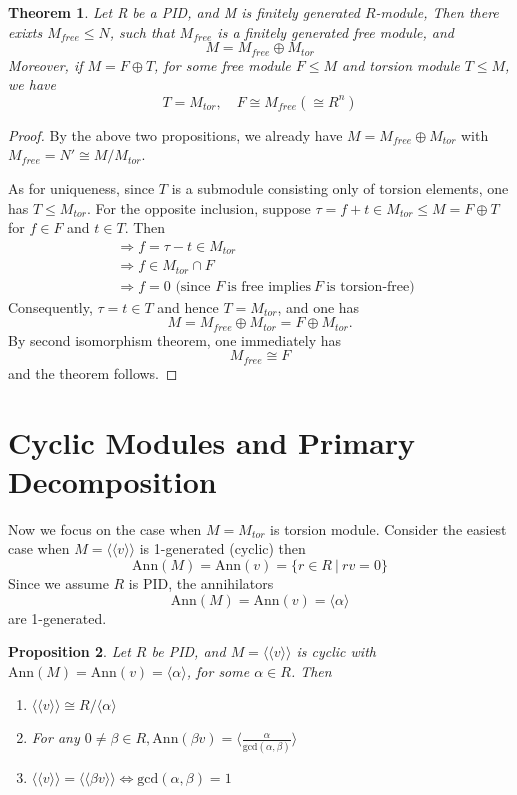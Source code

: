 \documentclass[12pt]{amsbook}
\newtheorem{theorem}{Theorem}[section]
\newtheorem{proposition}[theorem]{Proposition}
\begin{document}
\begin{theorem}
    Let R be a PID, and M is finitely generated $R$-module, Then there exixts $M_{free}\leq N$, such that $M_{free}$ is a finitely generated free module, and 
    $$M=M_{free}\oplus M_{tor}$$
    Moreover, if $M=F\oplus T$, for some free module $F\leq M$ and torsion module $T\leq M$, we have 
    $$T=M_{tor},\quad F\cong M_{free}(\cong R^n)$$
\end{theorem}

\begin{proof}
    By the above two propositions, we already have 
    $M= M_{free} \oplus M_{tor}$ with $M_{free} = N'\cong M/M_{tor}$.

    As for uniqueness, since $T$ is a submodule consisting only of torsion elements, one has $T\leq M_{tor}$. For the opposite inclusion, suppose $\tau = f+t\in M_{tor}\leq M=F\oplus T$
    for $f \in F$ and $t \in T$. Then
    \begin{align*}
        &\Rightarrow f=\tau-t \in M_{tor} \\
        &\Rightarrow f\in M_{tor} \cap F \\
        &\Rightarrow f=0 \text{ (since } F\ \text{is free implies}\ F\ \text{is torsion-free)}
    \end{align*}
    Consequently, $\tau=t\in T$ and hence $T = M_{tor}$, and one has
    $$M=M_{free}\oplus M_{tor}=F\oplus M_{tor}.$$
    By second isomorphism theorem, one immediately has $$M_{free}\cong F$$
    and the theorem follows.
\end{proof}

\section{Cyclic Modules and Primary Decomposition}
Now we focus on the case when $M=M_{tor}$ is torsion module. Consider the easiest case when
$M=\langle\langle v \rangle\rangle$ is 1-generated (cyclic) then
$$\mathrm{Ann}(M)=\mathrm{Ann}(v)=\{r\in R\ |\ rv=0\}$$
Since we assume $R$ is PID, the annihilators
$$\mathrm{Ann}(M)=\mathrm{Ann}(v)=\langle \alpha \rangle $$ 
are 1-generated.

\begin{proposition} \label{prop-cyclic}
    Let $R$ be PID, and $M=\langle\langle v \rangle\rangle$ is cyclic with $\mathrm{Ann}(M)=\mathrm{Ann}(v)=\langle \alpha \rangle$, for some $\alpha\in R$. Then
    \begin{enumerate}
        \item $\langle\langle v \rangle\rangle \cong R/\langle \alpha \rangle$
        \item For any $0\neq\beta \in R, \mathrm{Ann}(\beta v)=\langle \frac{\alpha}{\mathrm{gcd}(\alpha , \beta)}\rangle$
        \item $\langle \langle v\rangle \rangle = \langle\langle \beta v\rangle\rangle \Leftrightarrow \mathrm{gcd}(\alpha,\beta)=1$
    \end{enumerate}
\end{proposition}
\end{document}
